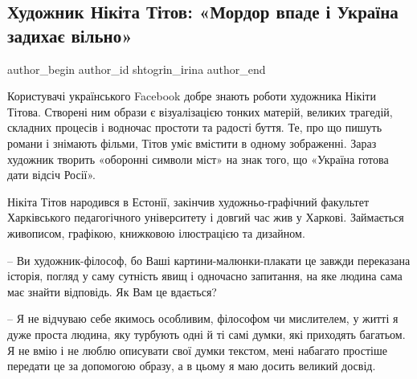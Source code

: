  
 
 
 
 
 
\subsection{Художник Нікіта Тітов: «Мордор впаде і Україна задихає вільно»}
\label{sec:06_02_2022.stz.news.ua.radiosvoboda.1.mordor_vpade}
 
\ifcmt
 author_begin
   author_id shtogrіn_іrina
 author_end
\fi

\begin{zznagolos}
Користувачі українського Facebook добре знають роботи художника Нікіти Тітова.
Створені ним образи є візуалізацією тонких матерій, великих трагедій, складних
процесів і водночас простоти та радості буття. Те, про що пишуть романи і
знімають фільми, Тітов уміє вмістити в одному зображенні. Зараз художник
творить «оборонні символи міст» на знак того, що «Україна готова дати відсіч
Росії».

Нікіта Тітов народився в Естонії, закінчив художньо-графічний факультет
Харківського педагогічного університету і довгий час жив у Харкові. Займається
живописом, графікою, книжковою ілюстрацією та дизайном.
\end{zznagolos}


– Ви художник-філософ, бо Ваші картини-малюнки-плакати це завжди переказана
історія, погляд у саму сутність явищ і одночасно запитання, на яке людина сама
має знайти відповідь. Як Вам це вдається?

– Я не відчуваю себе якимось особливим, філософом чи мислителем, у житті я дуже
проста людина, яку турбують одні й ті самі думки, які приходять багатьом. Я не
вмію і не люблю описувати свої думки текстом, мені набагато простіше передати
це за допомогою образу, а в цьому я маю досить великий досвід.

